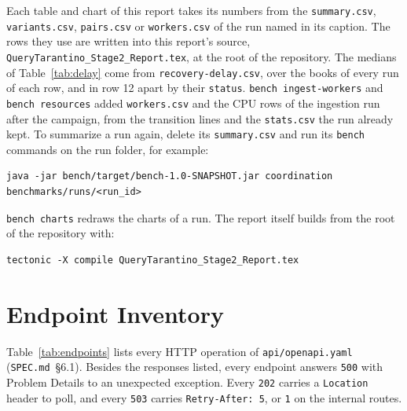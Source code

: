 \documentclass[11pt,a4paper]{article}
\newcommand{\code}[1]{\nolinkurl{#1}}
\newcommand{\spec}[1]{\code{SPEC.md}~\S#1}
\begin{document}
Each table and chart of this report takes its numbers from the \code{summary.csv}, \code{variants.csv},
\code{pairs.csv} or \code{workers.csv} of the run named in its caption. The rows they use are written into this
report's source, \code{QueryTarantino_Stage2_Report.tex}, at the root of the repository. The medians of
Table~\ref{tab:delay} come from \code{recovery-delay.csv}, over the books of every run of each row, and in row 12 apart
by their \code{status}. \code{bench ingest-workers} and \code{bench resources} added \code{workers.csv} and the CPU rows
of the ingestion run after the campaign, from the transition lines and the \code{stats.csv} the run already kept. To
summarize a run again, delete its \code{summary.csv} and run its \code{bench} commands on the run folder, for example:
\begin{lstlisting}
java -jar bench/target/bench-1.0-SNAPSHOT.jar coordination benchmarks/runs/<run_id>
\end{lstlisting}
\code{bench charts} redraws the charts of a run. The report itself builds from the root of the repository with:
\begin{lstlisting}
tectonic -X compile QueryTarantino_Stage2_Report.tex
\end{lstlisting}
\clearpage
\section{Endpoint Inventory}
\label{app:endpoints}

Table~\ref{tab:endpoints} lists every HTTP operation of \code{api/openapi.yaml} (\spec{6.1}). Besides the responses
listed, every endpoint answers \code{500} with Problem Details to an unexpected exception. Every \code{202} carries a
\code{Location} header to poll, and every \code{503} carries \code{Retry-After: 5}, or \code{1} on the internal routes.
\end{document}

